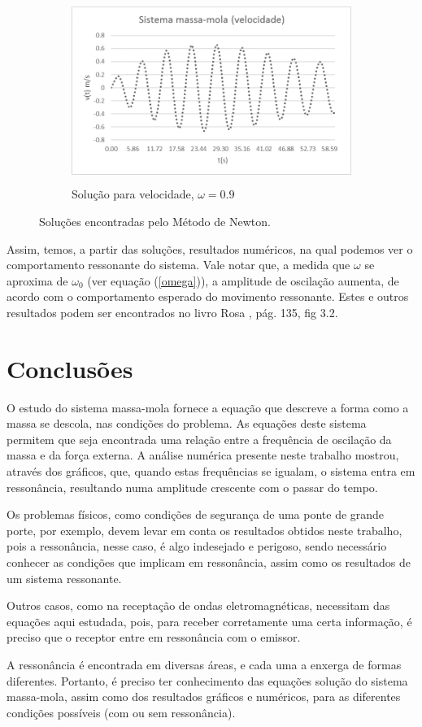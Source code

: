 \documentclass[12pt,fleqn]{article}
\begin{document}
\begin{figure}[h]
\begin{subfigure}{0.5\textwidth}
\includegraphics[width=1.0\linewidth, height=6cm]{velocidade2}
\caption{Solução para velocidade, $\omega=0.9$}
\label{fig:subim4}
\end{subfigure}
\caption{Soluções encontradas pelo Método de Newton.}
\label{fig:image2}
\end{figure}
\clearpage
\par
Assim, temos, a partir das soluções, resultados numéricos, na qual podemos ver o comportamento ressonante do sistema. Vale notar que, a medida que $\omega$ se aproxima de $\omega_{0}$ (ver equação (\ref{omega})), a amplitude de oscilação aumenta, de acordo com o comportamento esperado do movimento ressonante. Estes e outros resultados podem ser encontrados no livro Rosa \cite{Rosa}, pág. 135, fig 3.2.


\section{Conclusões} 
O estudo do sistema massa-mola fornece a equação que descreve a forma como a massa se descola, nas condições do problema. As equações deste sistema permitem que seja encontrada uma relação entre a frequência de oscilação da massa e da força externa. A análise numérica presente neste trabalho mostrou, através dos gráficos, que, quando estas frequências se igualam, o sistema entra em ressonância, resultando numa amplitude crescente com o passar do tempo.
\par
Os problemas físicos, como condições de segurança de uma ponte de grande porte, por exemplo, devem levar em conta os resultados obtidos neste trabalho, pois a ressonância, nesse caso, é algo indesejado e perigoso, sendo necessário conhecer as condições que implicam em ressonância, assim como os resultados de um sistema ressonante.
\par
Outros casos, como na receptação de ondas eletromagnéticas, necessitam das equações aqui estudada, pois, para receber corretamente uma certa informação, é preciso que o receptor entre em ressonância com o emissor.
\par
A ressonância é encontrada em diversas áreas, e cada uma a enxerga de formas diferentes. Portanto, é preciso ter conhecimento das equações solução do sistema massa-mola, assim como dos resultados gráficos e numéricos, para as diferentes condições possíveis (com ou sem ressonância).



\printbibliography[heading=bibintoc]
\end{document}
